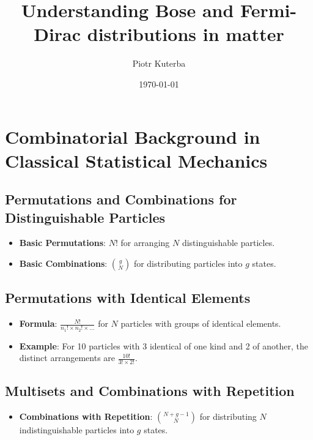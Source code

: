 \documentclass[12pt]{article}
\title{Understanding Bose and Fermi-Dirac distributions in matter}
\author{Piotr Kuterba}
\date{\today}
\begin{document}
\maketitle

\tableofcontents
\newpage


\section{Combinatorial Background in Classical Statistical Mechanics}

\subsection{Permutations and Combinations for Distinguishable Particles}
\begin{itemize}
    \item \textbf{Basic Permutations}: $N!$ for arranging $N$ distinguishable particles.
    \item \textbf{Basic Combinations}: $\binom{g}{N}$ for distributing particles into $g$ states.
\end{itemize}

\subsection{Permutations with Identical Elements}
\begin{itemize}
    \item \textbf{Formula}: $\frac{N!}{n_1! \times n_2! \times \ldots}$ for $N$ particles with groups of identical elements.
    \item \textbf{Example}: For 10 particles with 3 identical of one kind and 2 of another, the distinct arrangements are $\frac{10!}{3! \times 2!}$.
\end{itemize}

\subsection{Multisets and Combinations with Repetition}
\begin{itemize}
    \item \textbf{Combinations with Repetition}: $\binom{N + g - 1}{N}$ for distributing $N$ indistinguishable particles into $g$ states.
\end{itemize}
\end{document}
